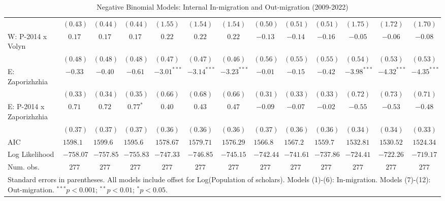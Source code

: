 \begin{table}
\begin{center}
\begin{tiny}
\begin{tabular}{l c c c c c c c c c c c c}
                            & $(0.43)$      & $(0.44)$     & $(0.44)$      & $(1.55)$       & $(1.54)$       & $(1.54)$       & $(0.50)$      & $(0.51)$    & $(0.51)$       & $(1.75)$       & $(1.72)$       & $(1.70)$       \\
W: P-2014 x Volyn           & $0.17$        & $0.17$       & $0.17$        & $0.22$         & $0.22$         & $0.22$         & $-0.13$       & $-0.14$     & $-0.16$        & $-0.05$        & $-0.06$        & $-0.08$        \\
                            & $(0.48)$      & $(0.48)$     & $(0.48)$      & $(0.47)$       & $(0.47)$       & $(0.46)$       & $(0.56)$      & $(0.55)$    & $(0.55)$       & $(0.54)$       & $(0.53)$       & $(0.53)$       \\
E: Zaporizhzhia             & $-0.33$       & $-0.40$      & $-0.61$       & $-3.01^{***}$  & $-3.14^{***}$  & $-3.23^{***}$  & $-0.01$       & $-0.15$     & $-0.42$        & $-3.98^{***}$  & $-4.32^{***}$  & $-4.35^{***}$  \\
                            & $(0.33)$      & $(0.34)$     & $(0.35)$      & $(0.66)$       & $(0.68)$       & $(0.66)$       & $(0.31)$      & $(0.33)$    & $(0.33)$       & $(0.72)$       & $(0.73)$       & $(0.71)$       \\
E: P-2014 x Zaporizhzhia    & $0.71$        & $0.72$       & $0.77^{*}$    & $0.40$         & $0.43$         & $0.47$         & $-0.09$       & $-0.07$     & $-0.02$        & $-0.55$        & $-0.53$        & $-0.48$        \\
                            & $(0.37)$      & $(0.37)$     & $(0.37)$      & $(0.36)$       & $(0.36)$       & $(0.36)$       & $(0.37)$      & $(0.36)$    & $(0.36)$       & $(0.34)$       & $(0.34)$       & $(0.33)$       \\
\hline
AIC                         & $1598.13$     & $1599.69$    & $1595.66$     & $1578.67$      & $1579.71$      & $1576.29$      & $1566.87$     & $1567.22$   & $1559.73$      & $1532.81$      & $1530.52$      & $1524.34$      \\
Log Likelihood              & $-758.07$     & $-757.85$    & $-755.83$     & $-747.33$      & $-746.85$      & $-745.15$      & $-742.44$     & $-741.61$   & $-737.86$      & $-724.41$      & $-722.26$      & $-719.17$      \\
Num. obs.                   & $277$         & $277$        & $277$         & $277$          & $277$          & $277$          & $277$         & $277$       & $277$          & $277$          & $277$          & $277$          \\
\hline
\multicolumn{13}{l}{\tiny{Standard errors in parentheses. All models include offset for Log(Population of scholars). Models (1)-(6): In-migration. Models (7)-(12): Out-migration. $^{***}p<0.001$; $^{**}p<0.01$; $^{*}p<0.05$.}}
\end{tabular}
\end{tiny}
\caption{Negative Binomial Models: Internal In-migration and Out-migration (2009-2022)}
\label{tab:combined_migration}
\end{center}
\end{table}
